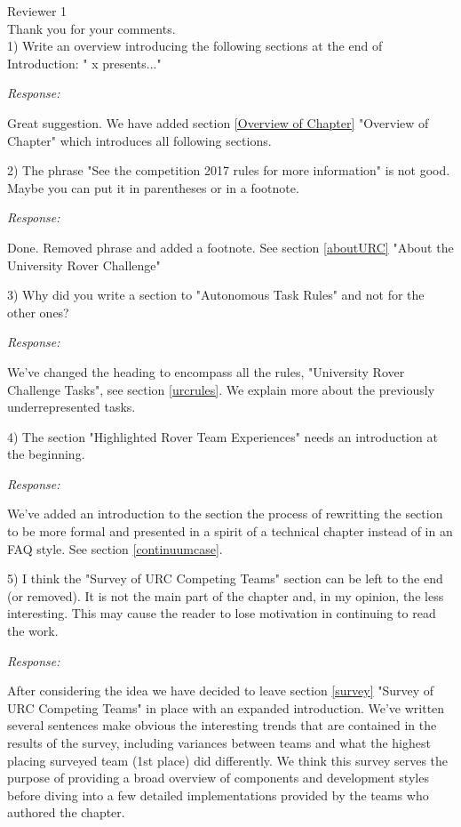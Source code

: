 \documentclass[runningheads,a4paper]{llncs}
\newcommand{\rsp}{\noindent \textit{Response:}}
\newcommand{\rev}[1]{
\newpage
\noindent Reviewer {#1}\\

\noindent Thank you for your comments.\\
}
\begin{document}
\begingroup
\setlength{\parskip}{1em}

\rev{1}

1)  Write an overview introducing the following sections at the end of Introduction: "  x presents..."

\rsp

Great suggestion. We have added section \ref{Overview of Chapter} "Overview of Chapter" which introduces all following sections.

2)  The phrase "See the competition 2017 rules for more information" is not good. Maybe you can put it in parentheses or in a footnote.

\rsp

Done. Removed phrase and added a footnote. See section \ref{aboutURC} "About the University Rover Challenge"

3)  Why did you write a section to "Autonomous Task Rules" and not for the other ones?

\rsp

We've changed the heading to encompass all the rules, "University Rover Challenge Tasks", see section \ref{urcrules}. We explain more about the previously underrepresented tasks.

4)  The section "Highlighted Rover Team Experiences" needs an introduction at the beginning.

\rsp

We've added an introduction to the section the process of rewritting the section to be more formal and presented in a spirit of a technical chapter instead of in an FAQ style. See section \ref{continuumcase}.

5)  I think the "Survey of URC Competing Teams" section can be left to the end (or removed). It is not the main part of the chapter and, in my opinion, the less interesting. This may cause the reader to lose motivation in continuing to read the work.

\rsp

After considering the idea we have decided to leave section \ref{survey} "Survey of URC Competing Teams" in place with an expanded introduction. We've written several sentences make obvious the interesting trends that are contained in the results of the survey, including variances between teams and what the highest placing surveyed team (1st place) did differently. We think this survey serves the purpose of providing a broad overview of components and development styles before diving into a few detailed implementations provided by the teams who authored the chapter. 
\end{document}
